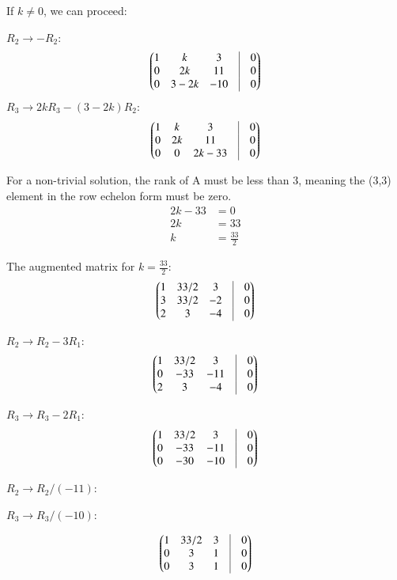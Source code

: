 \documentclass[journal]{IEEEtran}
\begin{document}
If $k \neq 0$, we can proceed:

$R_2 \rightarrow -R_2$:
\begin{align}
\myvec{
1 & k & 3 & \vrule & 0 \\
0 & 2k & 11 & \vrule & 0 \\
0 & 3 - 2k & -10 & \vrule & 0
}
\end{align}
$R_3 \rightarrow 2k R_3 - (3-2k) R_2$:
\begin{align}
\myvec{
1 & k & 3 & \vrule & 0 \\
0 & 2k & 11 & \vrule & 0 \\
0 & 0 & 2k - 33 & \vrule & 0
}
\end{align}

For a non-trivial solution, the rank of A must be less than 3, meaning the (3,3) element in the row echelon form must be zero.
\begin{align}
2k - 33 &= 0 \\
2k &= 33 \\
k &= \frac{33}{2}
\end{align}


The augmented matrix for $k = \frac{33}{2}$:
\begin{align}
\myvec{
1 & 33/2 & 3 & \vrule & 0 \\
3 & 33/2 & -2 & \vrule & 0 \\
2 & 3 & -4 & \vrule & 0
}
\end{align}

$R_2 \rightarrow R_2 - 3R_1$:
\begin{align}
\myvec{
1 & 33/2 & 3 & \vrule & 0 \\
0 & -33 & -11 & \vrule & 0 \\
2 & 3 & -4 & \vrule & 0
}
\end{align}

$R_3 \rightarrow R_3 - 2R_1$:
\begin{align}
\myvec{
1 & 33/2 & 3 & \vrule & 0 \\
0 & -33 & -11 & \vrule & 0 \\
0 & -30 & -10 & \vrule & 0
}
\end{align}

$R_2 \rightarrow R_2 / (-11)$:

$R_3 \rightarrow R_3 / (-10)$:

\begin{align}
\myvec{
1 & 33/2 & 3 & \vrule & 0 \\
0 & 3 & 1 & \vrule & 0 \\
0 & 3 & 1 & \vrule & 0
}
\end{align}
\end{document}
